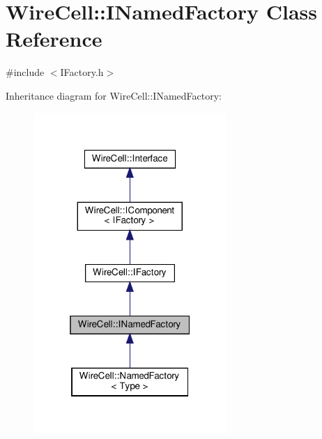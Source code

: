 \hypertarget{class_wire_cell_1_1_i_named_factory}{}\section{Wire\+Cell\+:\+:I\+Named\+Factory Class Reference}
\label{class_wire_cell_1_1_i_named_factory}


{\ttfamily \#include $<$I\+Factory.\+h$>$}



Inheritance diagram for Wire\+Cell\+:\+:I\+Named\+Factory\+:
\nopagebreak
\begin{figure}[H]
\begin{center}
\leavevmode
\includegraphics[width=208pt]{class_wire_cell_1_1_i_named_factory__inherit__graph}
\end{center}
\end{figure}



